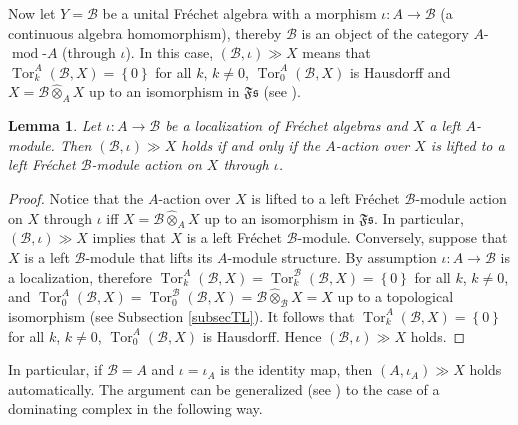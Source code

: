 \documentclass[12pt]{amsart}%
\theoremstyle{plain}
\newtheorem{lemma}{Lemma}
\numberwithin{equation}{section}
\numberwithin{equation}{section}
\numberwithin{theorem}{section}
\numberwithin{lemma}{section}
\numberwithin{remark}{section}
\numberwithin{example}{section}
\numberwithin{proposition}{section}
\numberwithin{definition}{section}
\numberwithin{corollary}{section}
\begin{document}
Now let $Y=\mathcal{B}$ be a unital Fr\'{e}chet algebra with a morphism
$\iota:A\rightarrow\mathcal{B}$ (a continuous algebra homomorphism), thereby
$\mathcal{B}$ is an object of the category $A$-$\operatorname*{mod}$-$A$
(through $\iota$). In this case, $\left(  \mathcal{B},\iota\right)  \gg X$
means that $\operatorname{Tor}_{k}^{A}\left(  \mathcal{B},X\right)  =\left\{
0\right\}  $ for all $k$, $k\neq0$, $\operatorname{Tor}_{0}^{A}\left(
\mathcal{B},X\right)  $ is Hausdorff and $X=\mathcal{B}\widehat{\otimes}_{A}X$
up to an isomorphism in $\mathfrak{Fs}$ (see \cite[Lemma 2.2]{DosJOT10}).

\begin{lemma}
\label{lemDom12}Let $\iota:A\rightarrow\mathcal{B}$ be a localization of
Fr\'{e}chet algebras and $X$ a left $A$-module. Then $\left(  \mathcal{B}%
,\iota\right)  \gg X$ holds if and only if the $A$-action over $X$ is lifted
to a left Fr\'{e}chet $\mathcal{B}$-module action on $X$ through $\iota$.
\end{lemma}

\begin{proof}
Notice that the $A$-action over $X$ is lifted to a left Fr\'{e}chet
$\mathcal{B}$-module action on $X$ through $\iota$ iff $X=\mathcal{B}%
\widehat{\otimes}_{A}X$ up to an isomorphism in $\mathfrak{Fs}$. In
particular, $\left(  \mathcal{B},\iota\right)  \gg X$ implies that $X$ is a
left Fr\'{e}chet $\mathcal{B}$-module. Conversely, suppose that $X$ is a left
$\mathcal{B}$-module that lifts its $A$-module structure. By assumption
$\iota:A\rightarrow\mathcal{B}$ is a localization, therefore
$\operatorname{Tor}_{k}^{A}\left(  \mathcal{B},X\right)  =\operatorname{Tor}%
_{k}^{\mathcal{B}}\left(  \mathcal{B},X\right)  =\left\{  0\right\}  $ for all
$k$, $k\neq0$, and $\operatorname{Tor}_{0}^{A}\left(  \mathcal{B},X\right)
=\operatorname{Tor}_{0}^{\mathcal{B}}\left(  \mathcal{B},X\right)
=\mathcal{B}\widehat{\otimes}_{\mathcal{B}}X=X$ up to a topological
isomorphism (see Subsection \ref{subsecTL}). It follows that
$\operatorname{Tor}_{k}^{A}\left(  \mathcal{B},X\right)  =\left\{  0\right\}
$ for all $k$, $k\neq0$, $\operatorname{Tor}_{0}^{A}\left(  \mathcal{B}%
,X\right)  $ is Hausdorff. Hence $\left(  \mathcal{B},\iota\right)  \gg X$ holds.
\end{proof}

In particular, if $\mathcal{B}=A$ and $\iota=\iota_{A}$ is the identity map,
then $\left(  A,\iota_{A}\right)  \gg X$ holds automatically. The argument can
be generalized (see \cite[Theorem 2.4]{DosJOT10}) to the case of a dominating
complex in the following way.
\end{document}
